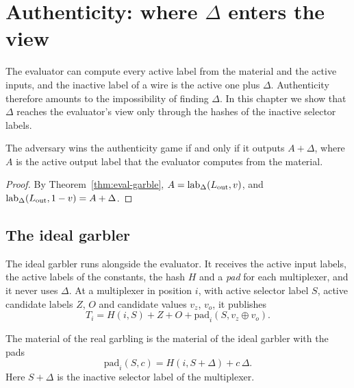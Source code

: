 \chapter{Authenticity: where \texorpdfstring{$\Delta$}{Delta} enters the view}
\label{chap:authenticity}

The evaluator can compute every active label from the material and the active inputs, and the
inactive label of a wire is the active one plus $\Delta$. Authenticity therefore amounts to the
impossibility of finding $\Delta$. In this chapter we show that $\Delta$ reaches the evaluator's
view only through the hashes of the inactive selector labels.

\begin{lemma}
  \label{lem:auth-win-iff}
  \leanok
  The adversary wins the authenticity game if and only if it outputs $A + \Delta$, where $A$ is
  the active output label that the evaluator computes from the material.
\end{lemma}

\begin{proof}
  \leanok
  By Theorem~\ref{thm:eval-garble}, $A = \operatorname{lab}_\Delta(L_{\mathrm{out}}, v)$, and
  $\operatorname{lab}_\Delta(L_{\mathrm{out}}, 1 - v) = A + \Delta$.
\end{proof}

\section{The ideal garbler}

\begin{definition}
  \label{def:ideal}
  \leanok
  The ideal garbler runs alongside the evaluator. It receives the active input labels, the
  active labels of the constants, the hash $H$ and a \emph{pad} for each multiplexer, and it
  never uses $\Delta$. At a multiplexer in position $i$, with active selector label $S$, active
  candidate labels $Z$, $O$ and candidate values $v_z$, $v_o$, it publishes
  \[ T_i = H(i, S) + Z + O + \mathrm{pad}_i(S, v_z \oplus v_o) . \]
\end{definition}

\begin{theorem}
  \label{thm:real-ideal}
  \leanok
  The material of the real garbling is the material of the ideal garbler with the pads
  \[ \mathrm{pad}_i(S, c) = H(i, S + \Delta) + c\,\Delta . \]
  Here $S + \Delta$ is the inactive selector label of the multiplexer.
\end{theorem}

